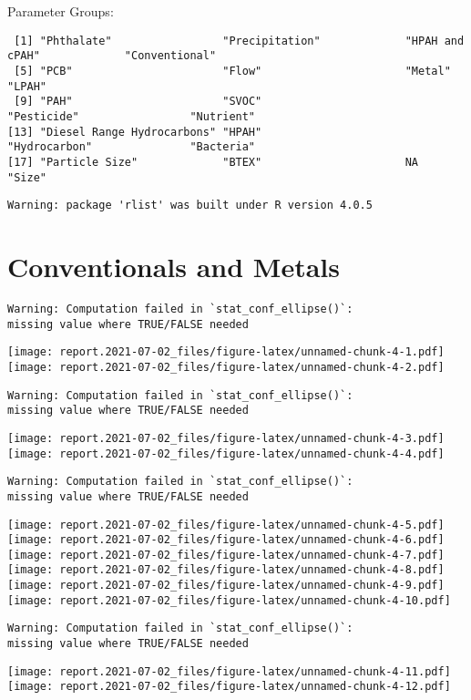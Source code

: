 \documentclass[
]{article}
\author{}
\date{\vspace{-2.5em}}
\begin{document}
Parameter Groups:

\begin{verbatim}
 [1] "Phthalate"                 "Precipitation"             "HPAH and cPAH"             "Conventional"             
 [5] "PCB"                       "Flow"                      "Metal"                     "LPAH"                     
 [9] "PAH"                       "SVOC"                      "Pesticide"                 "Nutrient"                 
[13] "Diesel Range Hydrocarbons" "HPAH"                      "Hydrocarbon"               "Bacteria"                 
[17] "Particle Size"             "BTEX"                      NA                          "Size"                     
\end{verbatim}

\begin{verbatim}
Warning: package 'rlist' was built under R version 4.0.5
\end{verbatim}

\hypertarget{conventionals-and-metals}{%
\section{Conventionals and Metals}\label{conventionals-and-metals}}

\begin{verbatim}
Warning: Computation failed in `stat_conf_ellipse()`:
missing value where TRUE/FALSE needed
\end{verbatim}

\texttt{[image: report.2021-07-02\_files/figure-latex/unnamed-chunk-4-1.pdf]}
\texttt{[image: report.2021-07-02\_files/figure-latex/unnamed-chunk-4-2.pdf]}

\begin{verbatim}
Warning: Computation failed in `stat_conf_ellipse()`:
missing value where TRUE/FALSE needed
\end{verbatim}

\texttt{[image: report.2021-07-02\_files/figure-latex/unnamed-chunk-4-3.pdf]}
\texttt{[image: report.2021-07-02\_files/figure-latex/unnamed-chunk-4-4.pdf]}

\begin{verbatim}
Warning: Computation failed in `stat_conf_ellipse()`:
missing value where TRUE/FALSE needed
\end{verbatim}

\texttt{[image: report.2021-07-02\_files/figure-latex/unnamed-chunk-4-5.pdf]}
\texttt{[image: report.2021-07-02\_files/figure-latex/unnamed-chunk-4-6.pdf]}
\texttt{[image: report.2021-07-02\_files/figure-latex/unnamed-chunk-4-7.pdf]}
\texttt{[image: report.2021-07-02\_files/figure-latex/unnamed-chunk-4-8.pdf]}
\texttt{[image: report.2021-07-02\_files/figure-latex/unnamed-chunk-4-9.pdf]}
\texttt{[image: report.2021-07-02\_files/figure-latex/unnamed-chunk-4-10.pdf]}

\begin{verbatim}
Warning: Computation failed in `stat_conf_ellipse()`:
missing value where TRUE/FALSE needed
\end{verbatim}

\texttt{[image: report.2021-07-02\_files/figure-latex/unnamed-chunk-4-11.pdf]}
\texttt{[image: report.2021-07-02\_files/figure-latex/unnamed-chunk-4-12.pdf]}
\end{document}
